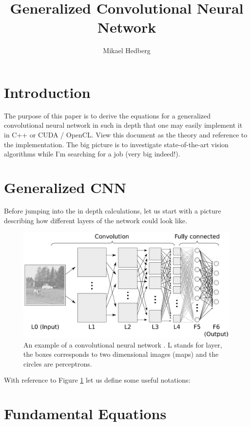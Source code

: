 \documentclass[a4paper,10pt]{article}
\title{Generalized Convolutional Neural Network}
\author{Mikael Hedberg}
\theoremstyle{definition}
\begin{document}
\maketitle

\section{Introduction}
The purpose of this paper is to derive the equations for a generalized convolutional neural network in such in depth that one may easily implement it in C++ or CUDA / OpenCL. View this document as the theory and reference to the implementation. The big picture is to investigate state-of-the-art vision algorithms while I'm searching for a job (very big indeed!).

\section{Generalized CNN}

Before jumping into the in depth calculations, let us start with a picture describing how different layers of the network could look like.\\

\begin{figure}[h!]
  \centering
    \includegraphics[scale=0.3]{convolutional-neural-network}
      \caption{An example of a convolutional neural network \cite{convNetPicture}. L stands for layer, the boxes corresponds to two dimensional images (maps) and the circles are perceptrons.}
      \label{fig:convNet}
\end{figure}

With reference to Figure \ref{fig:convNet} let us define some useful notations:\\

\section{Fundamental Equations}
\end{document}
